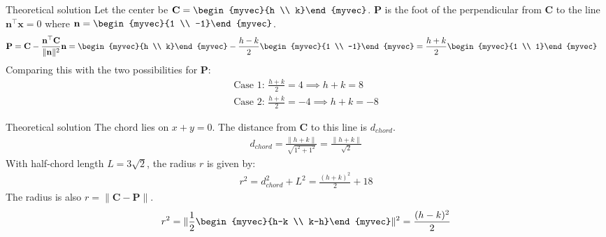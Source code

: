 \documentclass{beamer}
\numberwithin{equation}{section}
\theoremstyle{remark}
\providecommand{\norm}[1]{\lVert#1\rVert}
\let\vec\mathbf
\begin{document}
	\begin{frame}{Theoretical solution}
		Let the center be $\vec{C} = \begin{myvec}{h \\ k}\end{myvec}$. $\vec{P}$ is the foot of the perpendicular from $\vec{C}$ to the line $\vec{n}^\top\vec{x}=0$ where $\vec{n}=\begin{myvec}{1 \\ -1}\end{myvec}$.
		\begin{align}
			\vec{P} &= \vec{C} - \frac{\vec{n}^\top\vec{C}}{\norm{\vec{n}}^2}\vec{n} = \begin{myvec}{h \\ k}\end{myvec} - \frac{h-k}{2}\begin{myvec}{1 \\ -1}\end{myvec} = \frac{h+k}{2}\begin{myvec}{1 \\ 1}\end{myvec}
		\end{align}
		Comparing this with the two possibilities for $\vec{P}$:
		\begin{align}
			\text{Case 1: } \frac{h+k}{2} = 4 \implies h+k = 8 \\
			\text{Case 2: } \frac{h+k}{2} = -4 \implies h+k = -8
		\end{align}
	\end{frame}
	
	\begin{frame}{Theoretical solution}
		The chord lies on $x+y=0$. The distance from $\vec{C}$ to this line is $d_{chord}$.
		\begin{align}
			d_{chord} = \frac{\norm{h+k}}{\sqrt{1^2+1^2}} = \frac{\norm{h+k}}{\sqrt{2}}
		\end{align}
		With half-chord length $L=3\sqrt{2}$, the radius $r$ is given by:
		\begin{align}
			r^2 = d_{chord}^2 + L^2 = \frac{(h+k)^2}{2} + 18
		\end{align}
		The radius is also $r = \norm{\vec{C}-\vec{P}}$.
		\begin{align}
			r^2 = \norm{\frac{1}{2}\begin{myvec}{h-k \\ k-h}\end{myvec}}^2 = \frac{(h-k)^2}{2}
		\end{align}
	\end{frame}
	
\end{document}

